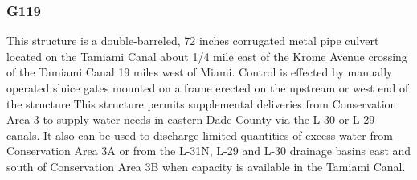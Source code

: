 %
%
%

\clearpage

\subsubsection{G119}

This structure is a double-barreled, 72 inches corrugated metal pipe culvert located on the Tamiami Canal about 1/4 mile east of the Krome Avenue crossing of the Tamiami Canal 19 miles west of Miami. Control is effected by manually operated sluice gates mounted on a frame erected on the upstream or west end of the structure.This structure permits supplemental deliveries from Conservation Area 3 to supply water needs in eastern Dade County via the L-30 or L-29 canals. It also can be used to discharge limited quantities of excess water from Conservation Area 3A or from the L-31N, L-29 and L-30 drainage basins east and south of Conservation Area 3B when capacity is available in the Tamiami Canal.


